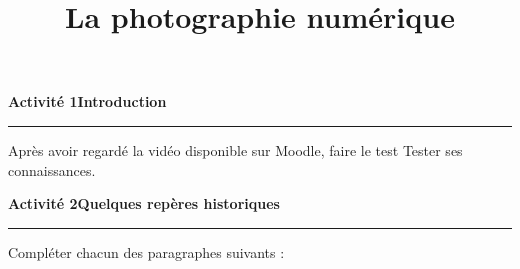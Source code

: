 \documentclass[a4paper]{article}
\begin{document}
\title{La photographie numérique}

\pagestyle{empty}

\date{}
\author{}

\maketitle{}

\thispagestyle{empty}

\vspace*{-1cm}
\noindent\textbf{Activité 1}\hfill{}\textbf{Introduction}
\smallskip
\hrule
\medskip

Après avoir regardé la vidéo disponible sur Moodle, faire le test \og{}Tester ses connaissances\fg{}.

\bigskip

\noindent\textbf{Activité 2}\hfill{}\textbf{Quelques repères historiques}
\smallskip
\hrule
\medskip

Compléter chacun des paragraphes suivants :
\end{document}
